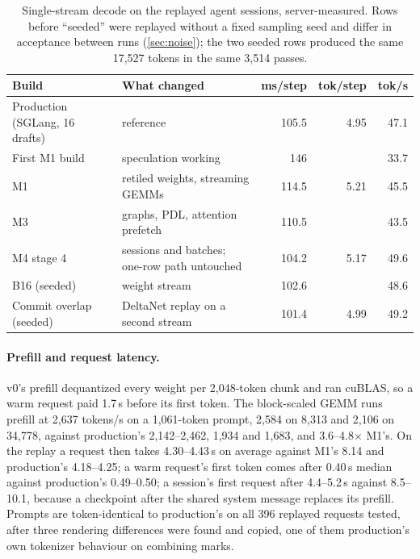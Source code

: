 \documentclass[11pt]{article}
\begin{document}
\begin{table}[t]
\centering\footnotesize
\begin{tabular}{llrrr}
\toprule
Build & What changed & ms/step & tok/step & tok/s \\
\midrule
Production (SGLang, 16 drafts) & reference & 105.5 & 4.95 & 47.1 \\
First M1 build & speculation working & 146 & & 33.7 \\
M1 & retiled weights, streaming GEMMs & 114.5 & 5.21 & 45.5 \\
M3 & graphs, PDL, attention prefetch & 110.5 & & 43.5 \\
M4 stage 4 & sessions and batches; one-row path untouched & 104.2 & 5.17 & 49.6 \\
B16 (seeded) & weight stream & 102.6 & & 48.6 \\
Commit overlap (seeded) & DeltaNet replay on a second stream & 101.4 & 4.99 & 49.2 \\
\bottomrule
\end{tabular}
\caption{Single-stream decode on the replayed agent sessions, server-measured. Rows before ``seeded'' were replayed
without a fixed sampling seed and differ in acceptance between runs (\cref{sec:noise}); the two seeded rows produced
the same 17,527 tokens in the same 3,514 passes.}
\label{tab:decode}
\end{table}

\paragraph{Prefill and request latency.}
v0's prefill dequantized every weight per 2,048-token chunk and ran cuBLAS, so a warm request paid 1.7\,s before its
first token. The block-scaled GEMM runs prefill at 2,637 tokens/s on a 1,061-token prompt, 2,584 on 8,313 and 2,106 on
34,778, against production's 2,142--2,462, 1,934 and 1,683, and 3.6--4.8$\times$ M1's. On the replay a request then
takes 4.30--4.43\,s on average against M1's 8.14 and production's 4.18--4.25; a warm request's first token comes after
0.40\,s median against production's 0.49--0.50; a session's first request after 4.4--5.2\,s against 8.5--10.1, because a
checkpoint after the shared system message replaces its prefill. Prompts are token-identical to production's on all
396 replayed requests tested, after three rendering differences were found and copied, one of them production's own
tokenizer behaviour on combining marks.
\end{document}
